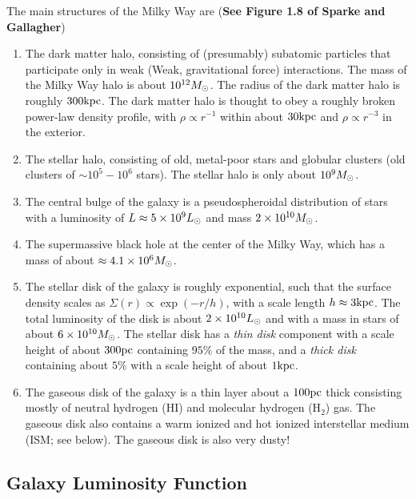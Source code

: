 \documentclass[]{article}
\begin{document}
The main structures of the Milky Way are ({\bf See Figure 1.8 of Sparke and Gallagher})

\begin{enumerate}


\item The dark matter halo, consisting of (presumably) subatomic particles that
participate only in weak (Weak, gravitational force) interactions. The mass of
the Milky Way halo is about $10^{12}M_{\odot}$. The radius of the dark matter halo
is roughly $300\mathrm{kpc}$. The dark matter halo is thought to obey a roughly broken
power-law density profile, with $\rho\propto r^{-1}$ within about $30\mathrm{kpc}$ and
$\rho\propto r^{-3}$ in the exterior.

\item The stellar halo, consisting of old, metal-poor stars and globular clusters
(old clusters of $\sim10^{5}-10^{6}$ stars). The stellar halo is only about
$10^{9}M_{\odot}$.

\item The central bulge of the galaxy is a pseudospheroidal distribution of
stars with a luminosity of $L\approx 5\times 10^{9}L_{\odot}$ 
and mass $2\times10^{10}M_{\odot}$.

\item The supermassive black hole at the center of the Milky Way, which has a
mass of about $\approx4.1\times10^{6}M_{\odot}$.

\item The stellar disk of the galaxy is roughly exponential, such that
the surface density scales as $\Sigma(r) \propto \exp(-r/h)$, 
with a scale length $h\approx3\mathrm{kpc}$. The total luminosity of the disk
is about $2\times10^{10}L_{\odot}$ and with a mass in stars of
about $6\times10^{10}M_{\odot}$. The stellar disk has a {\it thin disk} 
component with
a scale height of about $300\mathrm{pc}$ containing $95\%$ of the mass, and a
{\it thick disk} containing about $5\%$ with a scale height of about $1\mathrm{kpc}$.

\item The gaseous disk of the galaxy is a thin layer about a $100\mathrm{pc}$ thick
consisting mostly of neutral hydrogen (HI) and molecular hydrogen (H$_2$) gas.
The gaseous disk also contains a warm ionized and hot ionized interstellar medium 
(ISM; see below).
The gaseous disk is also very dusty!

\end{enumerate}


\subsection{Galaxy Luminosity Function}
\end{document}
